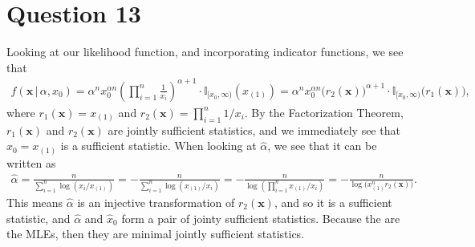 \documentclass[10pt]{article}
\begin{document}
\section{Question 13} \noindent
Looking at our likelihood function, and incorporating indicator functions, we see that 
\begin{align*}
    f(\mathbf{x} \,|\, \alpha, x_0)
    = \alpha^n x_0^{\alpha n} \left( \prod_{i=1}^n \frac{1}{x_i} \right)^{\alpha + 1} \cdot \mathbb{I}_{[x_0,\infty)}(x_{(1)})
    = \alpha^n x_0^{\alpha n} \Big( r_2(\mathbf{x}) \Big)^{\alpha + 1} \cdot \mathbb{I}_{[x_0,\infty)} \Big( r_1(\mathbf{x}) \Big),
\end{align*}
where \(r_1(\mathbf{x}) = x_{(1)}\) and \(r_2(\mathbf{x}) = \prod_{i = 1}^n 1 / x_i\). By the Factorization Theorem, \(r_1(\mathbf{x})\) and \(r_2(\mathbf{x})\)
are jointly sufficient statistics, and we immediately see that \(\hat{x}_0 = x_{(1)}\) is a sufficient statistic. When looking at \(\hat{\alpha}\), we see that 
it can be written as 
\begin{align*}
    \hat{\alpha}
    = \frac{n}{\sum_{i=1}^n \log(x_i / x_{(1)})}
    = - \frac{n}{\sum_{i=1}^n \log(x_{(1)} / x_i) }
    = - \frac{n}{\log \left( \prod_{i=1}^n  x_{(1)} / x_i \right)}
    = - \frac{n}{\log \Big( x_{(1)}^n r_2(\mathbf{x}) \Big)}.
\end{align*}
This means \(\hat{\alpha}\) is an injective transformation of \(r_2(\mathbf{x})\), and so it is a sufficient statistic, and \(\hat{\alpha}\) and \(\hat{x}_0\) 
form a pair of jointy sufficient statistics. Because the are the MLEs, then they are minimal jointly sufficient statistics. 
\end{document}
